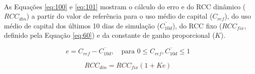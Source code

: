 \paragraph{} As Equações \ref{eq:100} e \ref{eq:101} mostram o cálculo do erro e do RCC dinâmico (\begin{math} RCC_{din} \end{math}) a partir do valor de referência para o uso médio de capital (\begin{math} C_{ref} \end{math}), do uso médio de capital dos últimos 10 dias de simulação (\begin{math} \overline{C_{10d}} \end{math}), do RCC fixo (\begin{math} RCC_{fix} \end{math}, definido pela Equação \ref{eq:60}) e da constante de ganho proporcional (\begin{math} K \end{math}).

\begin{equation} \label{eq:100}
    e = C_{ref} - \overline{C_{10d}}, \quad \mbox{para } 0 \le C_{ref}, \overline{C_{10d}} \le 1
\end{equation}

\begin{equation} \label{eq:101}
    RCC_{din} = RCC_{fix} (1 + K e)
\end{equation}



